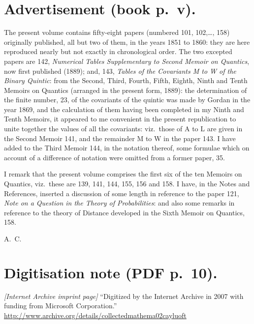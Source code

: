 \documentclass[11pt]{article}
\begin{document}
\section*{Advertisement (book p.\ v).}

\noindent
The present volume contains fifty-eight papers (numbered 101, 102,\ldots, 158) originally published, all but two of them, in the years 1851 to 1860: they are here reproduced nearly but not exactly in chronological order. The two excepted papers are 142, \emph{Numerical Tables Supplementary to Second Memoir on Quantics}, now first published (1889); and, 143, \emph{Tables of the Covariants M to W of the Binary Quintic}: from the Second, Third, Fourth, Fifth, Eighth, Ninth and Tenth Memoirs on Quantics (arranged in the present form, 1889): the determination of the finite number, 23, of the covariants of the quintic was made by Gordan in the year 1869, and the calculation of them having been completed in my Ninth and Tenth Memoirs, it appeared to me convenient in the present republication to unite together the values of all the covariants: viz.\ those of A to L are given in the Second Memoir 141, and the remainder M to W in the paper 143. I have added to the Third Memoir 144, in the notation thereof, some formulae which on account of a difference of notation were omitted from a former paper, 35.

I remark that the present volume comprises the first six of the ten Memoirs on Quantics, viz.\ these are 139, 141, 144, 155, 156 and 158. I have, in the Notes and References, inserted a discussion of some length in reference to the paper 121, \emph{Note on a Question in the Theory of Probabilities}: and also some remarks in reference to the theory of Distance developed in the Sixth Memoir on Quantics, 158.

\bigskip
\hfill A.\ C.
\clearpage


\section*{Digitisation note (PDF p.\ 10).}
\noindent
\emph{[Internet Archive imprint page]} ``Digitized by the Internet Archive in 2007 with funding from Microsoft Corporation.''\\
\url{http://www.archive.org/details/collectedmathema02cayluoft}
\clearpage
\end{document}
